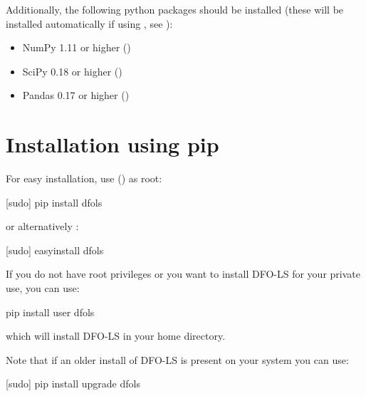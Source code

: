 \documentclass[letterpaper,10pt,english]{sphinxmanual}
\begin{document}
Additionally, the following python packages should be installed (these will be installed automatically if using , see {\hyperref[\detokenize{install:installation-using-pip}]{}}):
\begin{itemize}
\item {} 
NumPy 1.11 or higher ()

\item {} 
SciPy 0.18 or higher ()

\item {} 
Pandas 0.17 or higher ()

\end{itemize}


\section{Installation using pip}
\label{\detokenize{install:installation-using-pip}}
For easy installation, use  () as root:

\begin{sphinxVerbatim}[commandchars=\\\{\}]
\PYGZdl{} [sudo] pip install dfols
\end{sphinxVerbatim}

or alternatively :

\begin{sphinxVerbatim}[commandchars=\\\{\}]
\PYGZdl{} [sudo] easy\PYGZus{}install dfols
\end{sphinxVerbatim}

If you do not have root privileges or you want to install DFO-LS for your private use, you can use:

\begin{sphinxVerbatim}[commandchars=\\\{\}]
\PYGZdl{} pip install \PYGZhy{}\PYGZhy{}user dfols
\end{sphinxVerbatim}

which will install DFO-LS in your home directory.

Note that if an older install of DFO-LS is present on your system you can use:

\begin{sphinxVerbatim}[commandchars=\\\{\}]
\PYGZdl{} [sudo] pip install \PYGZhy{}\PYGZhy{}upgrade dfols
\end{sphinxVerbatim}
\end{document}
